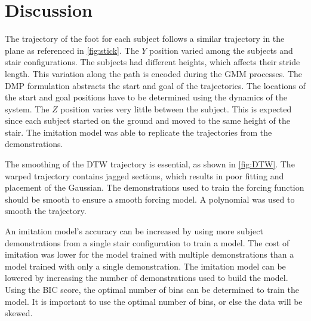 \section{Discussion} 
The trajectory of the foot for each subject follows a similar trajectory in the plane as referenced in \autoref{fig:stick}. The $Y$ position varied among the subjects and stair configurations. The subjects had different heights, which affects their stride length. This variation along the path is encoded during the GMM processes. The DMP formulation abstracts the start and goal of the trajectories. The locations of the start and goal positions have to be determined using the dynamics of the system. The $Z$ position varies very little between the subject. This is expected since each subject started on the ground and moved to the same height of the stair. The imitation model was able to replicate the trajectories from the demonstrations. 

The smoothing of the DTW trajectory is essential, as shown in \autoref{fig:DTW}. The warped trajectory contains jagged sections, which results in poor fitting and placement of the Gaussian. The demonstrations used to train the forcing function should be smooth to ensure a smooth forcing model. A polynomial was used to smooth the trajectory. 



An imitation model's accuracy can be increased by using more subject demonstrations from a single stair configuration to train a model. The cost of imitation was lower for the model trained with multiple demonstrations than a model trained with only a single demonstration. The imitation model can be lowered by increasing the number of demonstrations used to build the model. Using the BIC score, the optimal number of bins can be determined to train the model. It is important to use the optimal number of bins, or else the data will be skewed.  

